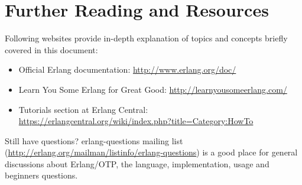 \chapter{Further Reading and Resources}

Following websites provide in-depth explanation of topics and concepts briefly covered in this document:

\begin{itemize}
	\item Official Erlang documentation: \url{http://www.erlang.org/doc/}
	\item Learn You Some Erlang for Great Good: \url{http://learnyousomeerlang.com/}
	\item Tutorials section at Erlang Central: \url{https://erlangcentral.org/wiki/index.php?title=Category:HowTo}
\end{itemize}

Still have questions? erlang-questions mailing list (\url{http://erlang.org/mailman/listinfo/erlang-questions}) is a good place for general discussions about Erlang/OTP, the language, implementation, usage and beginners questions.
